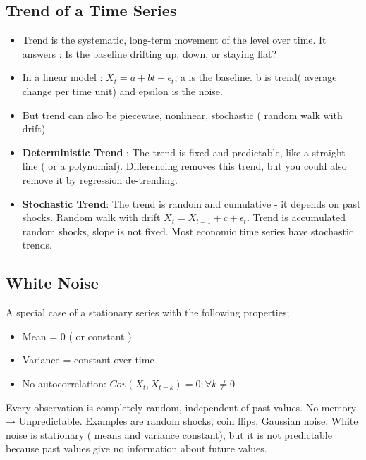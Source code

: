 \documentclass[10pt,a4paper]{article}
\begin{document}
	\subsection{Trend of a Time Series}
	\begin{itemize}
	    \item Trend is the systematic, long-term movement of the level over time. It answers : Is the baseline drifting up, down, or staying flat?
	    \item In a linear model : $X_t = a + bt + \epsilon_t$; a is the baseline. b is trend( average change per time unit) and epsilon is the noise.
	    \item But trend can also be piecewise, nonlinear, stochastic ( random walk with drift)
	    \item \textbf{Deterministic Trend}  : The trend is fixed and predictable, like a straight line ( or a polynomial). Differencing removes this trend, but you could also remove it by regression de-trending.
	    \item \textbf{Stochastic Trend}: The trend is random and cumulative - it depends on past shocks. Random walk with drift  $X_t = X_{t-1} + c + \epsilon_t$. Trend is accumulated random shocks, slope is not fixed. Most economic time series have stochastic trends.
	\end{itemize}
	
	\subsection{White Noise}
	A special case of a stationary series with the following properties;
	
	\begin{itemize}
	    \item Mean = 0 ( or constant )
	    \item Variance = constant over time
	    \item No autocorrelation:  $Cov(X_t,X_{t-k}) = 0 ; \forall k \neq 0 $
	\end{itemize}
	
	Every observation is completely random, independent of past values. No memory → Unpredictable. Examples are random shocks, coin flips, Gaussian noise. White noise is stationary ( means and variance constant), but it is not predictable because past values give no information about future values.
	
	
	
\end{document}
